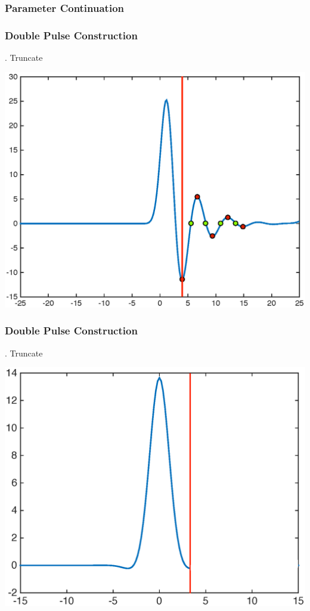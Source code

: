 \documentclass[16pt]{beamer}
\begin{document}
\begin{frame}
	\frametitle{Parameter Continuation}
	\begin{center}
	\end{center}
\end{frame}

\begin{frame}
	\frametitle{Double Pulse Construction}
	\fontsize{16}{7.2}. Truncate
	\begin{center}
	\includegraphics[width=0.8\linewidth]{images/singlepulsemagtailcut}
	\end{center}

\end{frame}

\begin{frame}
	\frametitle{Double Pulse Construction}
	\fontsize{16}{7.2}. Truncate
	\begin{center}
	\includegraphics[width=0.8\linewidth]{images/single}
	\end{center}
\end{frame}
\end{document}
